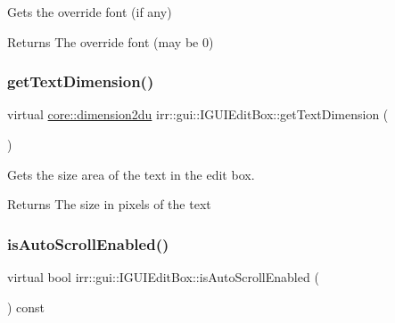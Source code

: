 Gets the override font (if any) 

\begin{DoxyReturn}{Returns}
The override font (may be 0) 
\end{DoxyReturn}
\mbox{\label{classirr_1_1gui_1_1IGUIEditBox_ac993c4647168460c68d56527ba213b9c}} 
\subsubsection{\texorpdfstring{get\+Text\+Dimension()}{getTextDimension()}}
{\footnotesize\ttfamily virtual \hyperlink{namespaceirr_1_1core_ad2e562e3219072e2f7fc7c2bba0ef0cb}{core\+::dimension2du} irr\+::gui\+::\+I\+G\+U\+I\+Edit\+Box\+::get\+Text\+Dimension (\begin{DoxyParamCaption}{ }\end{DoxyParamCaption})\hspace{0.3cm}{\ttfamily [pure virtual]}}



Gets the size area of the text in the edit box. 

\begin{DoxyReturn}{Returns}
The size in pixels of the text 
\end{DoxyReturn}
\mbox{\label{classirr_1_1gui_1_1IGUIEditBox_a4ccf066d1198f3548c7d04622067917f}} 
\subsubsection{\texorpdfstring{is\+Auto\+Scroll\+Enabled()}{isAutoScrollEnabled()}}
{\footnotesize\ttfamily virtual bool irr\+::gui\+::\+I\+G\+U\+I\+Edit\+Box\+::is\+Auto\+Scroll\+Enabled (\begin{DoxyParamCaption}{ }\end{DoxyParamCaption}) const\hspace{0.3cm}{\ttfamily [pure virtual]}}



